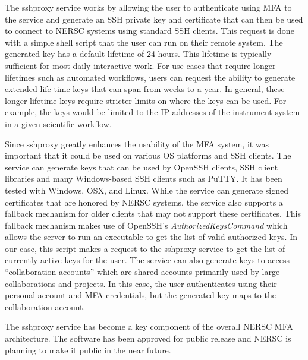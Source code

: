 \documentclass[sigconf,review]{acmart}
\begin{document}
The sshproxy service works by allowing the user to authenticate using MFA to the
service and generate an SSH private key and certificate \cite{habets2011} that
can then be used to connect to NERSC systems using standard SSH clients.  This
request is done with a simple shell script that the user can run on their remote
system.  The generated key has a default lifetime of 24 hours.  This lifetime is
typically sufficient for most daily interactive work.  For use cases that
require longer lifetimes such as automated workflows, users can request the
ability to generate extended life-time keys that can span from weeks to a year.
In general, these longer lifetime keys require stricter limits on where the keys
can be used.  For example, the keys would be limited to the IP addresses of the
instrument system in a given scientific workflow.

Since sshproxy greatly enhances the usability of the MFA system, it was
important that it could be used on various OS platforms and SSH clients.  The
service can generate keys that can be used by OpenSSH clients, SSH client
libraries and many Windows-based SSH clients such as PuTTY.  It has been tested
with Windows, OSX, and Linux.  While the service can generate signed
certificates that are honored by NERSC systems, the service also supports a
fallback mechanism for older clients that may not support these certificates.
This fallback mechanism makes use of OpenSSH's \textit{AuthorizedKeysCommand}
which allows the server to run an executable to get the list of valid authorized
keys.  In our case, this script makes a request to the sshproxy service to get
the list of currently active keys for the user.  The service can also generate
keys to access ``collaboration accounts'' which are shared accounts primarily
used by large collaborations and projects.  In this case, the user authenticates
using their personal account and MFA credentials, but the generated key maps to
the collaboration account.

The sshproxy service has become a key component of the overall NERSC MFA
architecture.  The software has been approved for public release and NERSC is
planning to make it public in the near future.
\end{document}
